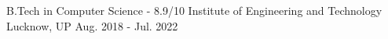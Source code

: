 

\begin{cventries}

  \cventry
    {B.Tech in Computer Science - 8.9/10} %
    {Institute of Engineering and Technology} %
    {Lucknow, UP} %
    {Aug. 2018 - Jul. 2022} %
    {
    }

\end{cventries}
\vspace{-0.35cm}
